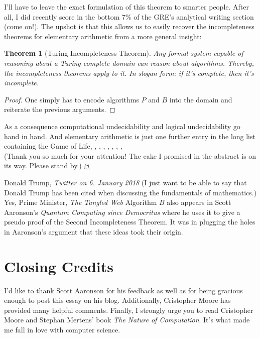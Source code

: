 \documentclass{article}
\theoremstyle{theorem}
\newtheorem{theorem}{Theorem}
\begin{document}
I'll have to leave the exact formulation of this theorem to smarter people. After all, I did recently score in the bottom 7\% of the GRE's analytical writing section (come on!). The upshot is that this allows us to easily recover the incompleteness theorems for elementary arithmetic from a more general insight:

\begin{theorem}[Turing Incompleteness Theorem]
Any formal system capable of reasoning about a Turing complete domain can reason about algorithms. Thereby, the incompleteness theorems apply to it. In slogan form: if it's complete, then it's incomplete.
\end{theorem}

\begin{proof}
One simply has to encode algorithms $P$ and $B$ into the domain and reiterate the previous arguments.
\end{proof}

As a consequence computational undecidability and logical undecidability go hand in hand. And elementary arithmetic is just one further entry in the long list containing the Game of Life, \scalebox{0.95}{Fractran}, \scalebox{0.9}{Post Tag Systems}, \scalebox{0.85}{Magic the Gathering}, \scalebox{0.8}{the human brain}, \scalebox{0.75}{Rule 110}, \scalebox{0.7}{Power Point}, \scalebox{0.65}{musical notation}, \scalebox{0.6}{...}\\[2em]
\footnotesize{(Thank you so much for your attention! The cake I promised in the abstract is on its way. Please stand by.) $\mathghost$}

\begin{thebibliography}{1}
Donald Trump, \textit{Twitter on 6. January 2018} (I just want to be able to say that Donald Trump has been cited when discussing the fundamentals of mathematics.)
Yes, Prime Minister, \textit{The Tangled Web}
 Algorithm $B$ also appears in Scott Aaronson's \textit{Quantum Computing since Democritus} where he uses it to give a pseudo proof of the Second Incompleteness Theorem. It was in plugging the holes in Aaronson's argument that these ideas took their origin.
\end{thebibliography}

\section*{Closing Credits}

I'd like to thank Scott Aaronson for his feedback as well as for being gracious enough to post this essay on his blog. Additionally, Cristopher Moore has provided many helpful comments. Finally, I strongly urge you to read Cristopher Moore and Stephan Mertens' book \textit{The Nature of Computation}. It's what made me fall in love with computer science.


\vfill\eject
\end{document}
